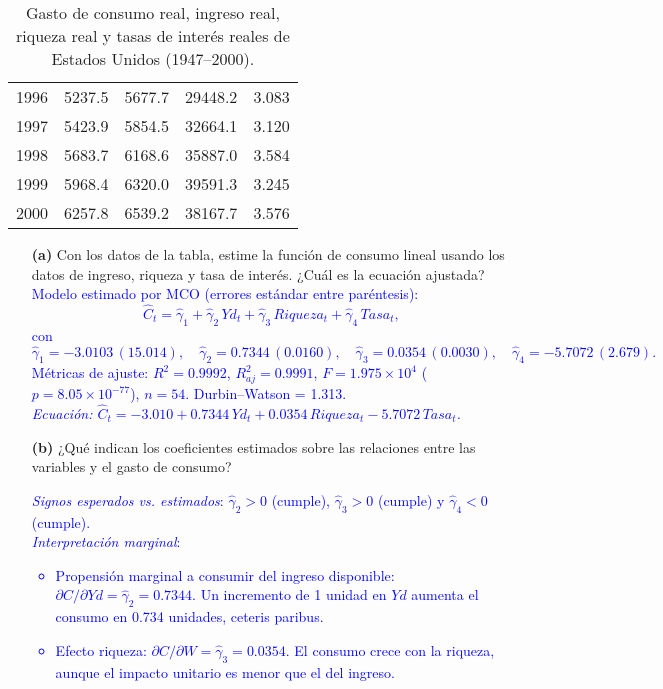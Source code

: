 \documentclass[10pt]{article}
\begin{document}
\begin{table}[H]
\begin{tabular}{lcccc}
        1996 & 5237.5 & 5677.7 & 29448.2 &   3.083 \\
        1997 & 5423.9 & 5854.5 & 32664.1 &   3.120 \\
        1998 & 5683.7 & 6168.6 & 35887.0 &   3.584 \\
        1999 & 5968.4 & 6320.0 & 39591.3 &   3.245 \\
        2000 & 6257.8 & 6539.2 & 38167.7 &   3.576 \\
        \hline
    \end{tabular}
    \caption{Gasto de consumo real, ingreso real, riqueza real y tasas de interés reales de Estados Unidos (1947--2000).}
    \label{tab:consumo_usa}
\end{table}

\begin{enumerate}
    \item[\textbf{(a)}] Con los datos de la tabla, estime la función de consumo lineal usando los datos de ingreso, riqueza y tasa
    de interés. ¿Cuál es la ecuación ajustada?\\
    \textcolor{blue}{
    Modelo estimado por MCO (errores estándar entre paréntesis):
    \[
    \widehat{C}_t=\hat\gamma_1+\hat\gamma_2\,Yd_t+\hat\gamma_3\,Riqueza_t+\hat\gamma_4\,Tasa_t,
    \]
    con $ \hat\gamma_1=-3.0103\,(15.014),\quad \hat\gamma_2=0.7344\,(0.0160),\quad \hat\gamma_3=0.0354\,(0.0030),\quad \hat\gamma_4=-5.7072\,(2.679).$ \\
    Métricas de ajuste: \(R^2=0.9992\), \(R^2_{aj}=0.9991\), \(F=1.975\times10^{4}\) (\(p=8.05\times10^{-77}\)), \(n=54\). Durbin–Watson = 1.313.\\
    \textit{Ecuación: \(\widehat{C}_t=-3.010+0.7344\,Yd_t+0.0354\,Riqueza_t-5.7072\,Tasa_t\).}
    }
    \item[\textbf{(b)}] ¿Qué indican los coeficientes estimados sobre las relaciones entre las variables y el gasto de consumo?\\
    \textcolor{blue}{ 
        \emph{Signos esperados vs. estimados}:  
        \(\hat\gamma_2>0\) (cumple), \(\hat\gamma_3>0\) (cumple) y \(\hat\gamma_4<0\) (cumple).\\
        \emph{Interpretación marginal}:  
        \begin{itemize}
        \item Propensión marginal a consumir del ingreso disponible: \(\partial C/\partial Yd=\hat\gamma_2=0.7344\). Un incremento de 1 unidad en \(Yd\) aumenta el consumo en 0.734 unidades, ceteris paribus.
        \item Efecto riqueza: \(\partial C/\partial W=\hat\gamma_3=0.0354\). El consumo crece con la riqueza, aunque el impacto unitario es menor que el del ingreso.

\end{itemize}}
\end{enumerate}
\end{document}
